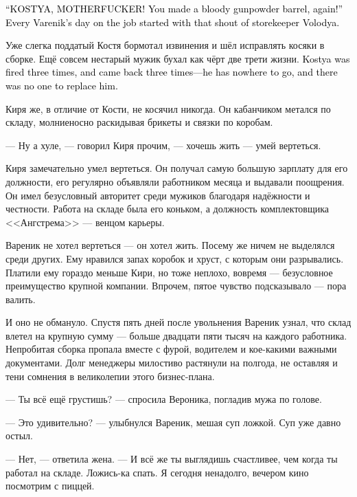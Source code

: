 \documentclass[a4paper,10pt,fleqn]{book}\usepackage{polyglossia}\setdefaultlanguage{english}\setotherlanguage{russian}\defaultfontfeatures{Ligatures=TeX,Mapping=tex-text} \usepackage{xcolor}\definecolor{lightgray}{HTML}{bbbbbb}\color{lightgray}\newcommand{\ml}[3]{\textcolor{black}{#3}}
\begin{document}
\ml{$0$}
{--- КОООСТЯ, БЛЯЯЯ!}
{``KOSTYA, MOTHERFUCKER!}
\ml{$0$}
{Опять ты мне, сука, собрал бочку с порохом! --- с этого крика кладовщика Володи начинался рабочий день Вареника.}
{You made a bloody gunpowder barrel, again!'' Every Varenik's day on the job started with that shout of storekeeper Volodya.}

Уже слегка поддатый Костя бормотал извинения и шёл исправлять косяки в сборке.
Ещё совсем нестарый мужик бухал как чёрт две трети жизни.
\ml{$0$}
{Костю увольняли три раза, и три раза он возвращался --- идти ему было некуда, и заменить его было некем.}
{Kostya was fired three times, and came back three times---he has nowhere to go, and there was no one to replace him.}

Киря же, в отличие от Кости, не косячил никогда.
Он кабанчиком метался по складу, молниеносно раскидывая брикеты и связки по коробам.

--- Ну а хуле, --- говорил Киря прочим, --- хочешь жить --- умей вертеться.

Киря замечательно умел вертеться.
Он получал самую большую зарплату для его должности, его регулярно объявляли работником месяца и выдавали поощрения.
Он имел безусловный авторитет среди мужиков благодаря надёжности и честности.
Работа на складе была его коньком, а должность комплектовщика <<Ангстрема>> --- венцом карьеры.

Вареник не хотел вертеться --- он хотел жить.
Посему же ничем не выделялся среди других.
Ему нравился запах коробок и хруст, с которым они разрывались.
Платили ему гораздо меньше Кири, но тоже неплохо, вовремя --- безусловное преимущество крупной компании.
Впрочем, пятое чувство подсказывало --- пора валить.

И оно не обмануло.
Спустя пять дней после увольнения Вареник узнал, что склад влетел на крупную сумму --- больше двадцати пяти тысяч на каждого работника.
Непробитая сборка пропала вместе с фурой, водителем и кое-какими важными документами.
Долг менеджеры милостиво растянули на полгода, не оставляя и тени сомнения в великолепии этого бизнес-плана.

--- Ты всё ещё грустишь? --- спросила Вероника, погладив мужа по голове.

--- Это удивительно? --- улыбнулся Вареник, мешая суп ложкой.
Суп уже давно остыл.

--- Нет, --- ответила жена.
--- И всё же ты выглядишь счастливее, чем когда ты работал на складе.
Ложись-ка спать.
Я сегодня ненадолго, вечером кино посмотрим с пиццей.
\end{document}

